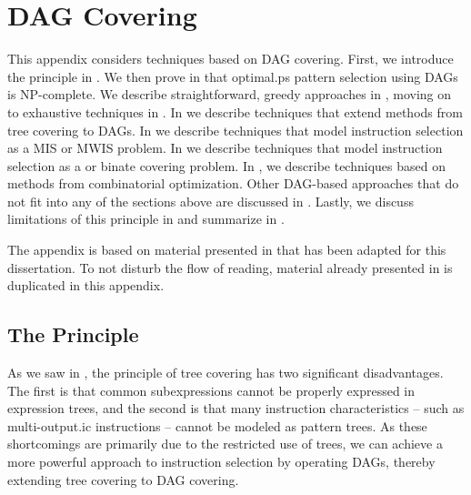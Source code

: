 %

\chapter{DAG Covering}

This appendix considers techniques based on \gls{DAG covering}.
%
First, we introduce the principle in .
%
We then prove in  that \gls{optimal.ps} \gls{pattern
  selection} using \glspl{DAG} is NP-complete.
%
We describe straightforward, greedy approaches in
, moving on to exhaustive techniques in
.
%
In  we describe
techniques that extend methods from \gls{tree covering} to \glspl{DAG}.
%
%
%
%
In  we describe techniques that model
\gls{instruction selection} as a \gls{MIS} or \gls{MWIS} problem.
%
%
%
%
In  we describe techniques that model
\gls{instruction selection} as a  or \gls{binate
  covering} problem.
%
In , we describe
techniques based on methods from combinatorial optimization.
%
Other \gls{DAG}-based approaches that do not fit into any of the sections above
are discussed in .
%
Lastly, we discuss limitations of this principle in 
and summarize in .

The appendix is based on material presented in
\cite[Chap.]{HjortBlindell:2016:Survey} that has been adapted for
this dissertation.
%
To not disturb the flow of reading, material already presented in
 is duplicated in this appendix.


\section{The Principle}

As we saw in , the \gls{principle} of \gls{tree
  covering} has two significant disadvantages.
%
The first is that common subexpressions cannot be properly expressed in
\glspl{expression tree}, and the second is that many \glspl{instruction
  characteristic} -- such as \gls{multi-output.ic} \glspl{instruction} -- cannot
be modeled as \glspl{pattern tree}.
%
As these shortcomings are primarily due to the restricted use of \glspl{tree},
we can achieve a more powerful approach to \gls{instruction selection} by
operating \glspl{DAG}, thereby extending \gls{tree covering} to \gls{DAG
  covering}.


